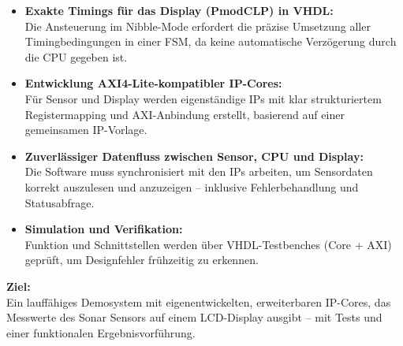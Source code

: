 \begin{itemize}
  \item \textbf{Exakte Timings für das Display (PmodCLP) in VHDL:}\\
  Die Ansteuerung im Nibble-Mode erfordert die präzise Umsetzung aller Timingbedingungen in einer FSM, da keine automatische Verzögerung durch die CPU gegeben ist.
\item \textbf{Entwicklung AXI4-Lite-kompatibler IP-Cores:}\\
  Für Sensor und Display werden eigenständige IPs mit klar strukturiertem Registermapping und AXI-Anbindung erstellt, basierend auf einer gemeinsamen IP-Vorlage.
\item \textbf{Zuverlässiger Datenfluss zwischen Sensor, CPU und Display:}\\
  Die Software muss synchronisiert mit den IPs arbeiten, um Sensordaten korrekt auszulesen und anzuzeigen – inklusive Fehlerbehandlung und Statusabfrage.
\item \textbf{Simulation und Verifikation:}\\
  Funktion und Schnittstellen werden über VHDL-Testbenches (Core + AXI) geprüft, um Designfehler frühzeitig zu erkennen.
\end{itemize}
\textbf{Ziel:}\\
Ein lauffähiges Demosystem mit eigenentwickelten, erweiterbaren IP-Cores, das Messwerte des Sonar Sensors auf einem LCD-Display ausgibt – mit Tests und einer funktionalen Ergebnisvorführung.